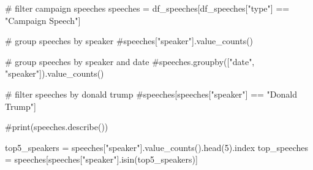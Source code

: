 \documentclass[
  letterpaper,
  DIV=11,
  numbers=noendperiod]{scrartcl}
\newenvironment{Shaded}{\begin{snugshade}}{\end{snugshade}}
\newcommand{\CommentTok}[1]{\textcolor[rgb]{0.37,0.37,0.37}{#1}}
\newcommand{\DecValTok}[1]{\textcolor[rgb]{0.68,0.00,0.00}{#1}}
\newcommand{\NormalTok}[1]{\textcolor[rgb]{0.00,0.23,0.31}{#1}}
\newcommand{\OperatorTok}[1]{\textcolor[rgb]{0.37,0.37,0.37}{#1}}
\newcommand{\StringTok}[1]{\textcolor[rgb]{0.13,0.47,0.30}{#1}}
\begin{document}
\begin{Shaded}
\begin{Highlighting}[]
\CommentTok{\# filter campaign speeches}
\NormalTok{speeches }\OperatorTok{=}\NormalTok{ df\_speeches[df\_speeches[}\StringTok{"type"}\NormalTok{] }\OperatorTok{==} \StringTok{"Campaign Speech"}\NormalTok{]}

\CommentTok{\# group speeches by speaker}
\CommentTok{\#speeches["speaker"].value\_counts()}

\CommentTok{\# group speeches by speaker and date}
\CommentTok{\#speeches.groupby(["date", "speaker"]).value\_counts()}

\CommentTok{\# filter speeches by donald trump}
\CommentTok{\#speeches[speeches["speaker"] == "Donald Trump"]}

\CommentTok{\#print(speeches.describe())}

\NormalTok{top5\_speakers }\OperatorTok{=}\NormalTok{ speeches[}\StringTok{"speaker"}\NormalTok{].value\_counts().head(}\DecValTok{5}\NormalTok{).index}
\NormalTok{top\_speeches }\OperatorTok{=}\NormalTok{ speeches[speeches[}\StringTok{"speaker"}\NormalTok{].isin(top5\_speakers)]}
\end{Highlighting}
\end{Shaded}
\end{document}
